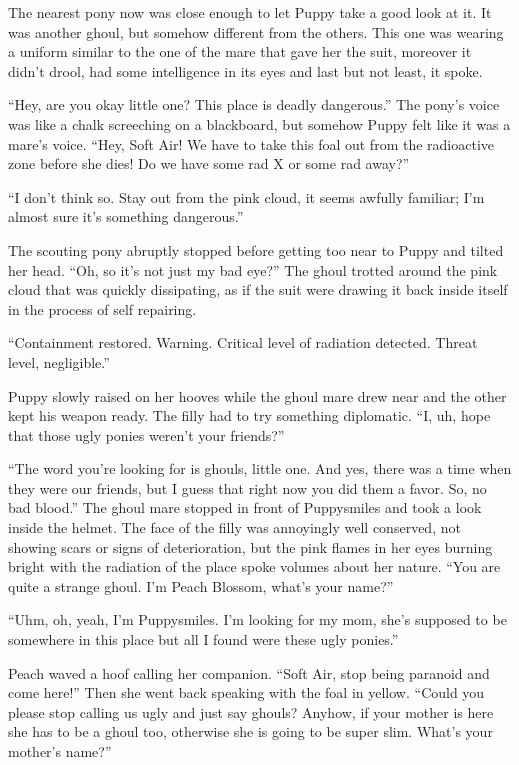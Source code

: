 The nearest pony now was close enough to let Puppy take a good look at it. It was another ghoul, but somehow different from the others. This one was wearing a uniform similar to the one of the mare that gave her the suit, moreover it didn't drool, had some intelligence in its eyes and last but not least, it spoke.

``Hey, are you okay little one? This place is deadly dangerous.'' The pony's voice was like a chalk screeching on a blackboard, but somehow Puppy felt like it was a mare's voice. ``Hey, Soft Air! We have to take this foal out from the radioactive zone before she dies! Do we have some rad X or some rad away?''

``I don't think so. Stay out from the pink cloud, it seems awfully familiar; I'm almost sure it's something dangerous.''

The scouting pony abruptly stopped before getting too near to Puppy and tilted her head. ``Oh, so it's not just my bad eye?'' The ghoul trotted around the pink cloud that was quickly dissipating, as if the suit were drawing it back inside itself in the process of self repairing.

``{\mt Containment restored. Warning. Critical level of radiation detected. Threat level, negligible.}''

Puppy slowly raised on her hooves while the ghoul mare drew near and the other kept his weapon ready. The filly had to try something diplomatic. ``I, uh, hope that those ugly ponies weren't your friends?''

``The word you're looking for is ghouls, little one. And yes, there was a time when they were our friends, but I guess that right now you did them a favor. So, no bad blood.'' The ghoul mare stopped in front of Puppysmiles and took a look inside the helmet. The face of the filly was annoyingly well conserved, not showing scars or signs of deterioration, but the pink flames in her eyes burning bright with the radiation of the place spoke volumes about her nature. ``You are quite a strange ghoul. I'm Peach Blossom, what's your name?''

``Uhm, oh, yeah, I'm Puppysmiles. I'm looking for my mom, she's supposed to be somewhere in this place but all I found were these ugly ponies.''

Peach waved a hoof calling her companion. ``Soft Air, stop being paranoid and come here!'' Then she went back speaking with the foal in yellow. ``Could you please stop calling us ugly and just say ghouls? Anyhow, if your mother is here she has to be a ghoul too, otherwise she is going to be super slim. What's your mother's name?''

